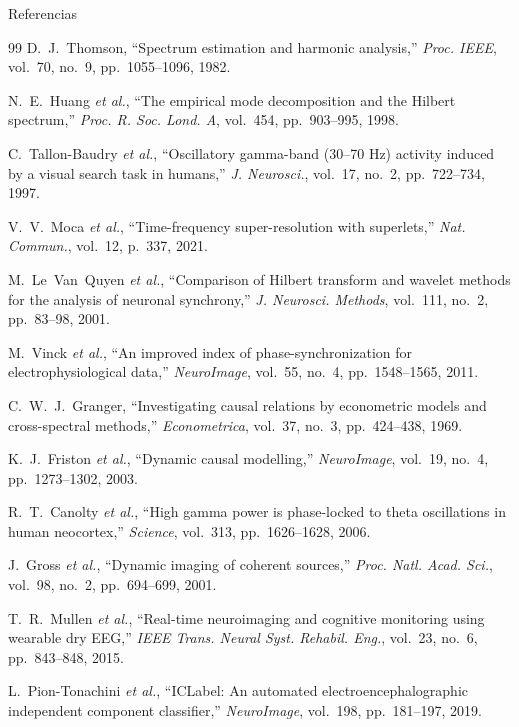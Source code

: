 \begin{frame}[allowframebreaks]{Referencias}
\begin{thebibliography}{99}
    D.~J.~Thomson, ``Spectrum estimation and harmonic analysis,''
    \textit{Proc. IEEE}, vol.~70, no.~9, pp.~1055--1096, 1982.

    N.~E.~Huang \textit{et al.}, ``The empirical mode decomposition and the Hilbert spectrum,''
    \textit{Proc. R. Soc. Lond. A}, vol.~454, pp.~903--995, 1998.

    C.~Tallon-Baudry \textit{et al.}, ``Oscillatory gamma-band (30--70 Hz) activity
    induced by a visual search task in humans,''
    \textit{J. Neurosci.}, vol.~17, no.~2, pp.~722--734, 1997.

    V.~V.~Moca \textit{et al.}, ``Time-frequency super-resolution with superlets,''
    \textit{Nat. Commun.}, vol.~12, p.~337, 2021.

    M.~Le~Van~Quyen \textit{et al.}, ``Comparison of Hilbert transform and wavelet methods
    for the analysis of neuronal synchrony,''
    \textit{J. Neurosci. Methods}, vol.~111, no.~2, pp.~83--98, 2001.

    M.~Vinck \textit{et al.}, ``An improved index of phase-synchronization for
    electrophysiological data,''
    \textit{NeuroImage}, vol.~55, no.~4, pp.~1548--1565, 2011.

    C.~W.~J.~Granger, ``Investigating causal relations by econometric models
    and cross-spectral methods,''
    \textit{Econometrica}, vol.~37, no.~3, pp.~424--438, 1969.

    K.~J.~Friston \textit{et al.}, ``Dynamic causal modelling,''
    \textit{NeuroImage}, vol.~19, no.~4, pp.~1273--1302, 2003.

    R.~T.~Canolty \textit{et al.}, ``High gamma power is phase-locked
    to theta oscillations in human neocortex,''
    \textit{Science}, vol.~313, pp.~1626--1628, 2006.

    J.~Gross \textit{et al.}, ``Dynamic imaging of coherent sources,''
    \textit{Proc. Natl. Acad. Sci.}, vol.~98, no.~2, pp.~694--699, 2001.

    T.~R.~Mullen \textit{et al.}, ``Real-time neuroimaging and cognitive monitoring
    using wearable dry EEG,''
    \textit{IEEE Trans. Neural Syst. Rehabil. Eng.}, vol.~23, no.~6, pp.~843--848, 2015.

    L.~Pion-Tonachini \textit{et al.}, ``ICLabel: An automated electroencephalographic
    independent component classifier,''
    \textit{NeuroImage}, vol.~198, pp.~181--197, 2019.


\end{thebibliography}
\end{frame}
